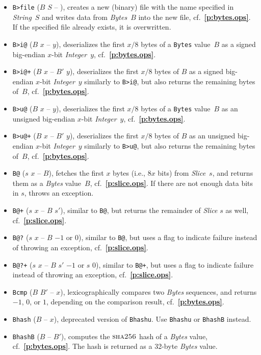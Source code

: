 \documentclass[12pt,oneside]{article}
\def\refpoint#1{{\rm\textbf{\ref{#1}}}}
\let\ptref=\refpoint
\def\opsc#1{\operatorname{\textsc{#1}}}
\def\Sha{\opsc{sha256}}
\begin{document}
\begin{itemize}
\item {\tt B>file} ($B$ $S$ -- ), creates a new (binary) file with the name specified in {\em String\/}~$S$ and writes data from {\em Bytes}~$B$ into the new file, cf.~\ptref{p:bytes.ops}. If the specified file already exists, it is overwritten.
\item {\tt B>i@} ($B$ $x$ -- $y$), deserializes the first $x/8$ bytes of a {\tt Bytes} value~$B$ as a signed big-endian $x$-bit {\em Integer}~$y$, cf.~\ptref{p:bytes.ops}.
\item {\tt B>i@+} ($B$ $x$ -- $B'$ $y$), deserializes the first $x/8$ bytes of $B$ as a signed big-endian $x$-bit {\em Integer}~$y$ similarly to {\tt B>i@}, but also returns the remaining bytes of~$B$, cf.~\ptref{p:bytes.ops}.
\item {\tt B>u@} ($B$ $x$ -- $y$), deserializes the first $x/8$ bytes of a {\tt Bytes} value~$B$ as an unsigned big-endian $x$-bit {\em Integer}~$y$, cf.~\ptref{p:bytes.ops}.
\item {\tt B>u@+} ($B$ $x$ -- $B'$ $y$), deserializes the first $x/8$ bytes of $B$ as an unsigned big-endian $x$-bit {\em Integer}~$y$ similarly to {\tt B>u@}, but also returns the remaining bytes of~$B$, cf.~\ptref{p:bytes.ops}.
\item {\tt B@} ($s$ $x$ -- $B$), fetches the first $x$ bytes (i.e., $8x$ bits) from {\em Slice}~$s$, and returns them as a {\em Bytes\/} value~$B$, cf.~\ptref{p:slice.ops}. If there are not enough data bits in $s$, throws an exception.
\item {\tt B@+} ($s$ $x$ -- $B$ $s'$), similar to {\tt B@}, but returns the remainder of {\em Slice\/} $s$ as well, cf.~\ptref{p:slice.ops}.
\item {\tt B@?} ($s$ $x$ -- $B$ $-1$ or $0$), similar to {\tt B@}, but uses a flag to indicate failure instead of throwing an exception, cf.~\ptref{p:slice.ops}.
\item {\tt B@?+} ($s$ $x$ -- $B$ $s'$ $-1$ or $s$ $0$), similar to {\tt B@+}, but uses a flag to indicate failure instead of throwing an exception, cf.~\ptref{p:slice.ops}.
\item {\tt Bcmp} ($B$ $B'$ -- $x$), lexicographically compares two {\em Bytes\/} sequences, and returns $-1$, $0$, or $1$, depending on the comparison result, cf.~\ptref{p:bytes.ops}.
\item {\tt Bhash} ($B$ -- $x$), deprecated version of {\tt Bhashu}. Use {\tt Bhashu} or {\tt BhashB} instead.
\item {\tt BhashB} ($B$ -- $B'$), computes the $\Sha$ hash of a {\em Bytes\/} value, cf.~\ptref{p:bytes.ops}. The hash is returned as a 32-byte {\em Bytes\/} value.

\end{itemize}
\end{document}
